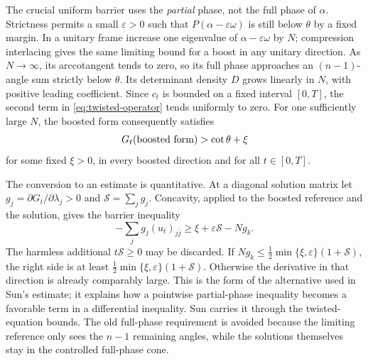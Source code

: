\documentclass[12pt,reqno]{amsart}
\begin{document}
The crucial uniform barrier uses the \emph{partial} phase, not the full phase of $\alpha$. Strictness permits a small $\varepsilon>0$ such that $P(\alpha-\varepsilon\omega)$ is still below $\theta$ by a fixed margin. In a unitary frame increase one eigenvalue of $\alpha-\varepsilon\omega$ by $N$; compression interlacing gives the same limiting bound for a boost in any unitary direction. As $N\to\infty$, its arccotangent tends to zero, so its full phase approaches an $(n-1)$-angle sum strictly below $\theta$. Its determinant density $D$ grows linearly in $N$, with positive leading coefficient. Since $c_t$ is bounded on a fixed interval $[0,T]$, the second term in \eqref{eq:twisted-operator} tends uniformly to zero. For one sufficiently large $N$, the boosted form consequently satisfies
\[
 G_t(\hbox{boosted form})>\cot\theta+\xi
\]
for some fixed $\xi>0$, in every boosted direction and for all $t\in[0,T]$.

The conversion to an estimate is quantitative. At a diagonal solution matrix let $g_j=\partial G_t/\partial\lambda_j>0$ and $\mathcal S=\sum_jg_j$. Concavity, applied to the boosted reference and the solution, gives the barrier inequality
\begin{equation}\label{eq:barrier-alternative}
 -\sum_jg_j(u_t)_{j\bar j}
       \geq\xi+\varepsilon\mathcal S-Ng_k.
\end{equation}
The harmless additional $t\mathcal S\geq0$ may be discarded. If $Ng_k\leq\tfrac12\min\{\xi,\varepsilon\}(1+\mathcal S)$, the right side is at least $\tfrac12\min\{\xi,\varepsilon\}(1+\mathcal S)$. Otherwise the derivative in that direction is already comparably large. This is the form of the alternative used in Sun's estimate; it explains how a pointwise partial-phase inequality becomes a favorable term in a differential inequality. Sun carries it through the twisted-equation bounds. The old full-phase requirement is avoided because the limiting reference only sees the $n-1$ remaining angles, while the solutions themselves stay in the controlled full-phase cone.
\end{document}
